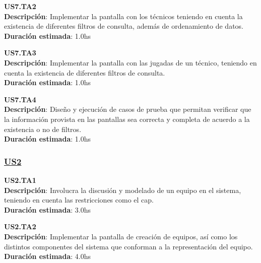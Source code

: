 \begin{tcolorbox}
\textbf{US7.TA2} \\
\textbf{Descripción}: Implementar la pantalla con los técnicos teniendo en cuenta la existencia de diferentes filtros de consulta, además de ordenamiento de datos.\\
\textbf{Duración estimada}: 1.0hs
\end{tcolorbox}
\vspace{10pt}

\begin{tcolorbox}
\textbf{US7.TA3} \\
\textbf{Descripción}: Implementar la pantalla con las jugadas de un técnico, teniendo en cuenta la existencia de diferentes filtros de consulta.\\
\textbf{Duración estimada}: 1.0hs
\end{tcolorbox}
\vspace{10pt}

\begin{tcolorbox}
\textbf{US7.TA4} \\
\textbf{Descripción}: Diseño y ejecución de casos de prueba que permitan verificar que la información provista en las pantallas sea correcta y completa de acuerdo a la existencia o no de filtros.\\
\textbf{Duración estimada}: 1.0hs
\end{tcolorbox}
\vspace{10pt}

\subsubsection*{\underline{US2}}

\begin{tcolorbox}
\textbf{US2.TA1} \\
\textbf{Descripción}: Involucra la discusión y modelado de un equipo en el sistema, teniendo en cuenta las restricciones como el cap.\\
\textbf{Duración estimada}: 3.0hs
\end{tcolorbox}
\vspace{10pt}

\begin{tcolorbox}
\textbf{US2.TA2} \\
\textbf{Descripción}: Implementar la pantalla de creación de equipos, así como los distintos componentes del sistema que conforman a la representación del equipo.\\
\textbf{Duración estimada}: 4.0hs
\end{tcolorbox}
\vspace{10pt}

